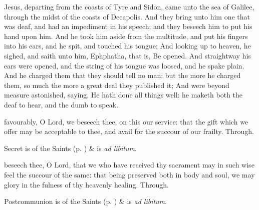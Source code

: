 
 Jesus, departing from the coasts of Tyre and Sidon, came unto the sea of Galilee, through the midst of the coasts of Decapolis. And they bring unto him one that was deaf, and had an impediment in his speech; and they beseech him to put his hand upon him. And he took him aside from the multitude, and put his fingers into his ears, and he spit, and touched his tongue; And looking up to heaven, he sighed, and saith unto him, Ephphatha, that is, Be opened. And straightway his ears were opened, and the string of his tongue was loosed, and he spake plain. And he charged them that they should tell no man: but the more he charged them, so much the more a great deal they published it; And were beyond measure astonished, saying, He hath done all things well: he maketh both the deaf to hear, and the dumb to speak.


\secret
{} favourably, O Lord, we beseech thee, on this our service: that the gift which we offer may be acceptable to thee, and avail for the succour of our frailty. Through.
\begin{rubric}
     Secret is of the Saints (p. \pageref{SPSaints}) \&  is \emph{ad libitum}.
\end{rubric}


\postcommunion
{} beseech thee, O Lord, that we who have received thy sacrament may in such wise feel the succour of the same: that being preserved both in body and soul, we may glory in the fulness of thy heavenly healing. Through.
\begin{rubric}
     Postcommunion is of the Saints (p. \pageref{SPSaints}) \&  is \emph{ad libitum}.
\end{rubric}

